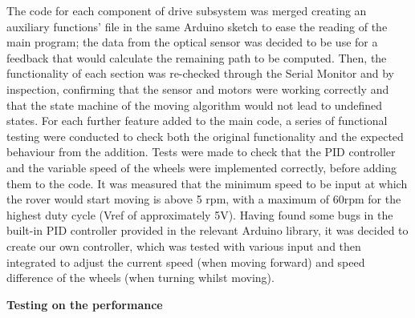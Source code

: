 \documentclass[10pt,twoside]{article}
\begin{document}
\begin{enumerate}
     The code for each component of drive subsystem was merged creating an auxiliary functions’ file in the same Arduino sketch to ease the reading of the main program; the data from the optical sensor was decided to be use for a feedback that would calculate the remaining path to be computed. Then, the functionality of each section was re-checked through the Serial Monitor and by inspection, confirming that the sensor and motors were working correctly and that the state machine of the moving algorithm would not lead to undefined states.
    For each further feature added to the main code, a series of functional testing were conducted to check both the original functionality and the expected behaviour from the addition. 
    Tests were made to check that the PID controller and the variable speed of the wheels were implemented correctly, before adding them to the code. It was measured that the minimum speed to be input at which the rover would start moving is above 5 rpm, with a maximum of 60rpm for the highest duty cycle (Vref of approximately 5V). Having found some bugs in the built-in PID controller provided in the relevant Arduino library, it was decided to create our own controller, which was tested with various input and then integrated to adjust the current speed (when moving forward) and speed difference of the wheels (when turning whilst moving).
\end{enumerate}
\textbf{Testing on the performance }
\end{document}
